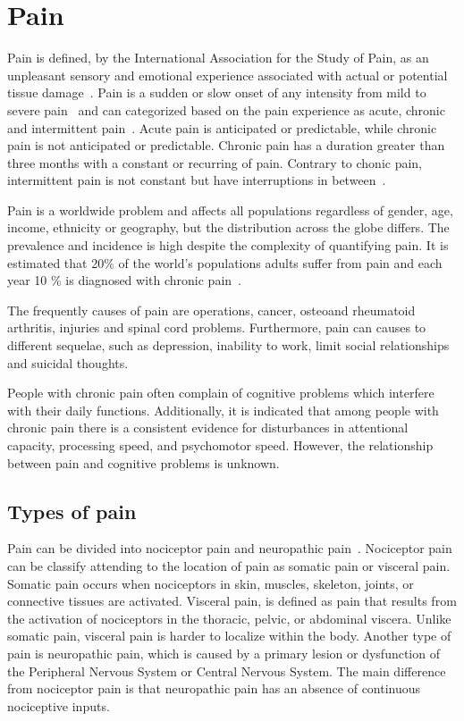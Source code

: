 \section{Pain}
Pain is defined, by the International Association for the Study of Pain, as an unpleasant sensory and emotional experience associated with actual or potential tissue damage~\cite{Kerstman2013}. Pain is a sudden or slow onset of any intensity from mild to severe pain~\cite{Mello2016} and can categorized based on the pain experience as acute, chronic and intermittent pain~\cite{Goldberg2011}. Acute pain is anticipated or predictable, while  chronic pain is not anticipated or predictable. Chronic pain has a duration greater than three months with a constant or recurring of pain. Contrary to chonic pain, intermittent pain is not constant but have interruptions in between~\cite{Mello2016}.

Pain is a worldwide problem and affects all populations regardless of gender, age, income, ethnicity or geography, but the distribution across the globe differs. The prevalence and incidence is high despite the complexity of quantifying pain. It is estimated that 20\% of the world's populations adults suffer from pain and each year 10 \% is diagnosed with chronic pain~\cite{Goldberg2011}. 

The frequently causes of pain are operations, cancer, osteoand rheumatoid arthritis, injuries and spinal cord problems. Furthermore, pain can causes to different sequelae, such as depression, inability to work, limit social relationships and suicidal thoughts.~\cite{Goldberg2011}

People with chronic pain often complain of cognitive problems which interfere with their daily functions. Additionally, it is indicated that among people with chronic pain there is a consistent evidence for disturbances in attentional capacity, processing speed, and psychomotor speed. However, the relationship between pain and cognitive problems is unknown.~\cite{Geisser2018}

\subsection{Types of pain}
Pain can be divided into nociceptor pain and neuropathic pain~\cite{Steeds2013}. Nociceptor pain can be classify attending to the location of pain as somatic pain or visceral pain. Somatic pain occurs when nociceptors in skin, muscles, skeleton, joints, or connective tissues are activated. Visceral pain, is defined as pain that results from the activation of nociceptors in the thoracic, pelvic, or abdominal viscera. Unlike somatic pain, visceral pain is harder to localize within the body. Another type of pain is neuropathic pain, which is caused by a primary lesion or dysfunction of the Peripheral Nervous System or Central Nervous System. The main difference from nociceptor pain is that neuropathic pain has an absence of continuous nociceptive inputs. \cite{Kerstman2013}

